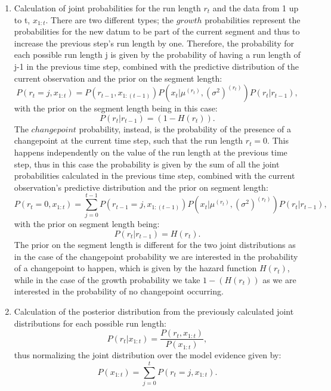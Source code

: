 \documentclass[11pt,twoside,a4paper]{report}
\begin{document}
\begin{enumerate}
\item Calculation of joint probabilities for the run length $r_t$ and the data from 1 up to t, $x_{1:t}$. There are two different types; the $growth$ probabilities represent the probabilities for the new datum to be part of the current segment and thus to increase the previous step's run length by one. Therefore, the probability for each possible run length j is given by the probability of having a run length of j-1 in the previous time step, combined with the predictive distribution of the current observation and the prior on the segment length:
\begin{equation}\label{eq:second1}
P(r_t = j , x_{1:t}) = P(r_{t-1} , x_{1:(t-1)})  P(x_t | \mu^{(r_t)}, (\sigma^2)^{(r_t)})  P(r_t | r_{t - 1}),
\end{equation}
with the prior on the segment length being in this case:
\begin{equation}
P(r_t | r_{t - 1}) = (1-H(r_t)).
\end{equation}
The $changepoint$ probability, instead, is the probability of the presence of a changepoint at the current time step, such that the run length $r_t = 0$. This happens independently on the value of the run length at the previous time step, thus in this case the probability is given by the sum of all the joint probabilities calculated in the previous time step, combined with the current observation's predictive distribution and the prior on segment length:
\begin{equation}
P(r_t = 0 , x_{1:t}) = \sum_{j=0}^{t-1} P(r_{t-1} = j , x_{1:(t-1)})  P(x_t | \mu^{(r_t)}, (\sigma^2)^{(r_t)})  P(r_t | r_{t - 1}),
\end{equation}
with the prior on segment length being:
\begin{equation}\label{eq:second4}
P(r_t | r_{t - 1}) = H(r_t).
\end{equation} 
The prior on the segment length is different for the two joint distributions as in the case of the changepoint probability we are interested in the probability of a changepoint to happen, which is given by the hazard function $H(r_t)$, while in the case of the growth probability we take $1 - (H(r_t))$ as we are interested in the probability of no changepoint occurring.

\item Calculation of the posterior distribution from the previously calculated joint distributions for each possible run length:
\begin{equation}\label{eq:third1}
P(r_t | x_{1:t}) = \frac{P(r_t , x_{1:t})} {P(x_{1:t})},
\end{equation} 
thus normalizing the joint distribution over the model evidence given by:
\begin{equation}\label{eq:third2}
P(x_{1:t}) = \sum_{j=0}^{t} P(r_t = j , x_{1:t}).
\end{equation} 


\end{enumerate}
\end{document}
